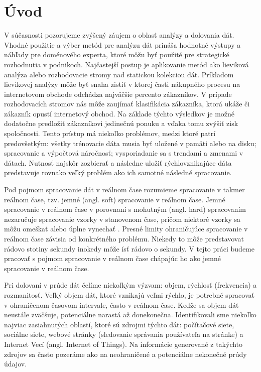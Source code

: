
\chapter{Úvod}
V súčasnosti pozorujeme zvýšený záujem o oblasť analýzy a dolovania dát. Vhodné použitie a výber metód pre analýzu dát prináša hodnotné výstupy a náhľady pre doménového experta, ktoré môžu byť použité pre strategické rozhodnutia v podnikoch. Najčastejší postup je aplikovanie metód ako lieviková analýza alebo rozhodovacie stromy nad statickou kolekciou dát. Príkladom lievikovej analýzy môže byť snaha zistiť v ktorej časti nákupného procesu na internetovom obchode odchádza najväčšie percento zákazníkov. V prípade rozhodovacích stromov nás môže zaujímať klasifikácia zákazníka, ktorá ukáže či zákazník opustí internetový obchod. Na základe týchto výsledkov je možné dodatočne predložiť zákazníkovi jedinečnú ponuku a vďaka tomu zvýšiť zisk spoločnosti. Tento prístup má niekoľko problémov, medzi ktoré patrí predovšetkým: všetky trénovacie dáta musia byť uložené v pamäti alebo na disku; spracovanie a výpočtová náročnosť; vysporiadanie sa s trendami a zmenami v dátach. Nutnosť najskôr zozbierať a následne uložiť rýchlovznikajúce dáta predstavuje rovnako veľký problém ako ich samotné následné spracovanie.
\par
Pod pojmom spracovanie dát v reálnom čase rozumieme spracovanie v takmer reálnom čase, tzv. jemné (angl. soft) spracovanie v reálnom čase. Jemné spracovanie v reálnom čase v porovnaní s mohutným (angl. hard) spracovaním nezaručuje spracovanie vzorky v stanovenom čase, pričom niektoré vzorky sa môžu omeškať alebo úplne vynechať \citep{stankovic1988real}. Presné limity ohraničujúce spracovanie v reálnom čase závisia od konkrétného problému. Niekedy to môže predstavovat rádovo stotiny sekundy inokedy môže ísť rádovo o sekundy. V tejto práci budeme pracovať s pojmom spracovanie v reálnom čase chápajúc ho ako jemné spracovanie v reálnom čase.
\par
Pri dolovaní v prúde dát čelíme niekoľkým výzvam: objem,  rýchlosť (frekvencia) a rozmanitosť. Veľký objem dát, ktoré vznikajú veľmi rýchlo, je potrebné spracovať v ohraničenom časovom intervale, často v reálnom čase. Keďže sa objem dát neustále zväčšuje, potenciálne narastá až donekonečna. Identifikovali sme niekoľko najviac zasiahnutých oblastí, ktoré sú zdrojmi týchto dát: počítačové siete, sociálne siete, webové stránky (sledovanie správania používateľa na stránke) a Internet Vecí (angl. Internet of Things). Na informácie generované z takýchto zdrojov sa často pozeráme ako na neohraničené a potenciálne nekonečné prúdy údajov.
